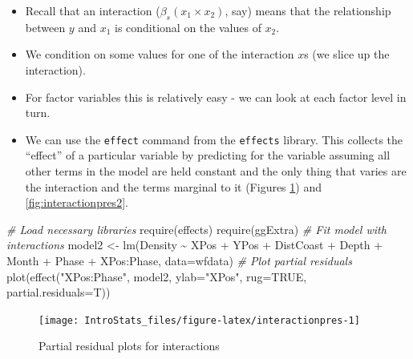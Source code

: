 \documentclass[
  oneside]{krantz}
\newenvironment{Shaded}{\begin{snugshade}}{\end{snugshade}}
\newcommand{\AttributeTok}[1]{\textcolor[rgb]{0.77,0.63,0.00}{#1}}
\newcommand{\CommentTok}[1]{\textcolor[rgb]{0.56,0.35,0.01}{\textit{#1}}}
\newcommand{\ConstantTok}[1]{\textcolor[rgb]{0.00,0.00,0.00}{#1}}
\newcommand{\FunctionTok}[1]{\textcolor[rgb]{0.00,0.00,0.00}{#1}}
\newcommand{\NormalTok}[1]{#1}
\newcommand{\OtherTok}[1]{\textcolor[rgb]{0.56,0.35,0.01}{#1}}
\newcommand{\SpecialCharTok}[1]{\textcolor[rgb]{0.00,0.00,0.00}{#1}}
\newcommand{\StringTok}[1]{\textcolor[rgb]{0.31,0.60,0.02}{#1}}
\providecommand{\tightlist}{%
  \setlength{\itemsep}{0pt}\setlength{\parskip}{0pt}}
\begin{document}
\begin{itemize}
\tightlist
\item
  Recall that an interaction (\(\beta_s(x_1 \times x_2)\), say) means that the relationship between \(y\) and \(x_1\) is conditional on the values of \(x_2\).
\item
  We condition on some values for one of the interaction \(x\)s (we slice up the interaction).
\item
  For factor variables this is relatively easy - we can look at each factor level in turn.
\item
  We can use the \texttt{effect} command from the \texttt{effects} library. This collects the ``effect'' of a particular variable by predicting for the variable assuming all other terms in the model are held constant and the only thing that varies are the interaction and the terms marginal to it (Figures \ref{fig:interactionpres}) and \ref{fig:interactionpres2}.
\end{itemize}

\begin{Shaded}
\begin{Highlighting}[]
\CommentTok{\# Load necessary libraries}
\FunctionTok{require}\NormalTok{(effects)}
\FunctionTok{require}\NormalTok{(ggExtra)}
\CommentTok{\# Fit model with interactions}
\NormalTok{model2 }\OtherTok{\textless{}{-}} \FunctionTok{lm}\NormalTok{(Density }\SpecialCharTok{\textasciitilde{}}\NormalTok{ XPos }\SpecialCharTok{+}\NormalTok{ YPos }\SpecialCharTok{+}\NormalTok{ DistCoast }\SpecialCharTok{+}\NormalTok{ Depth }\SpecialCharTok{+} 
\NormalTok{                Month }\SpecialCharTok{+}\NormalTok{ Phase }\SpecialCharTok{+}\NormalTok{ XPos}\SpecialCharTok{:}\NormalTok{Phase, }\AttributeTok{data=}\NormalTok{wfdata)}
\CommentTok{\# Plot partial residuals}
\FunctionTok{plot}\NormalTok{(}\FunctionTok{effect}\NormalTok{(}\StringTok{"XPos:Phase"}\NormalTok{, model2, }\AttributeTok{ylab=}\StringTok{"XPos"}\NormalTok{, }\AttributeTok{rug=}\ConstantTok{TRUE}\NormalTok{, }\AttributeTok{partial.residuals=}\NormalTok{T))}
\end{Highlighting}
\end{Shaded}

\begin{figure}

{\centering \texttt{[image: IntroStats\_files/figure-latex/interactionpres-1]} 

}

\caption{Partial residual plots for interactions}\label{fig:interactionpres}
\end{figure}
\end{document}

